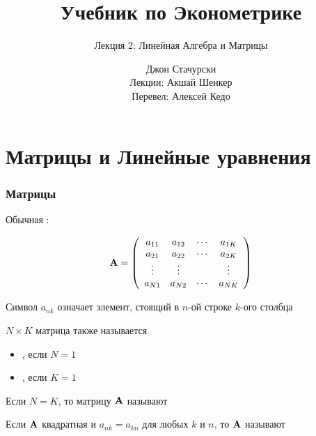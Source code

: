 






\title{Учебник по Эконометрике}

\subtitle
{Лекция 2: Линейная Алгебра и Матрицы}

\author{Джон Стачурски \\ \vspace{0.5em} 
	\scriptsize Лекции: Акшай Шенкер \\ \vspace{0.1em} 
	\scriptsize Перевел: Алексей Кедо}






\begin{frame}
  \titlepage
\end{frame}

\section{Матрицы и Линейные уравнения}

\begin{frame}
    
    \vspace{2em}
    \frametitle{Матрицы}

    Обычная : 
    
    \begin{equation*}
        \mathbf A = 
        \left(
        \begin{array}{cccc}
            a_{11} & a_{12} & \cdots & a_{1K} \\
            a_{21} & a_{22} & \cdots & a_{2K} \\
            \vdots & \vdots &  & \vdots \\
            a_{N1} & a_{N2} & \cdots & a_{NK} 
        \end{array}
        \right)
    \end{equation*}
    
    \vspace{.7em}
    Символ $a_{nk}$ означает элемент, стоящий в $n$-ой строке $k$-ого столбца

\end{frame}


\begin{frame}
    
    \vspace{2em}
    $N \times K$ матрица также называется 
    \begin{itemize}
        \item {}, если $N = 1$
        \item {}, если $K = 1$
    \end{itemize}
    
    \vspace{.7em}
    Если $N = K$, то матрицу $\mathbf A$ называют 
    
    Если $\mathbf A$ квадратная и $a_{nk} = a_{kn}$ для любых $k$ и $n$, то $\mathbf A$
    называют    
    
\end{frame}

